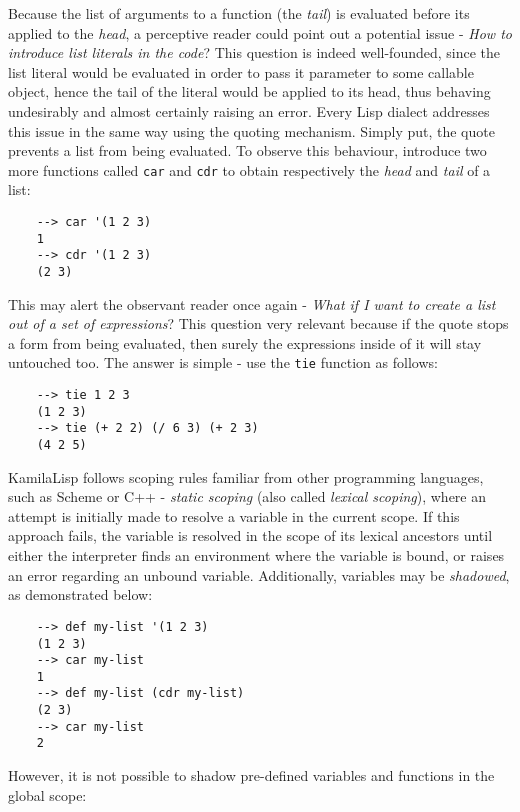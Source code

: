 Because the list of arguments to a function (the \textit{tail}) is evaluated before its applied to the \textit{head}, a perceptive reader could point out a potential issue - \textit{How to introduce list literals in the code}? This question is indeed well-founded, since the list literal would be evaluated in order to pass it parameter to some callable object, hence the tail of the literal would be applied to its head, thus behaving undesirably and almost certainly raising an error. Every Lisp dialect addresses this issue in the same way using the quoting mechanism. Simply put, the quote prevents a list from being evaluated. To observe this behaviour, introduce two more functions called \verb|car| and \verb|cdr| to obtain respectively the \textit{head} and \textit{tail} of a list:

\begin{Verbatim}
    --> car '(1 2 3)
    1
    --> cdr '(1 2 3)
    (2 3)
\end{Verbatim}

This may alert the observant reader once again - \textit{What if I want to create a list out of a set of expressions}? This question very relevant because if the quote stops a form from being evaluated, then surely the expressions inside of it will stay untouched too. The answer is simple - use the \verb|tie| function as follows:

\begin{Verbatim}
    --> tie 1 2 3
    (1 2 3)
    --> tie (+ 2 2) (/ 6 3) (+ 2 3)
    (4 2 5)
\end{Verbatim}

KamilaLisp follows scoping rules familiar from other programming languages, such as Scheme or C++ - \textit{static scoping} (also called \textit{lexical scoping}), where an attempt is initially made to resolve a variable in the current scope. If this approach fails, the variable is resolved in the scope of its lexical ancestors until either the interpreter finds an environment where the variable is bound, or raises an error regarding an unbound variable. Additionally, variables may be \textit{shadowed}, as demonstrated below:

\begin{Verbatim}
    --> def my-list '(1 2 3)
    (1 2 3)
    --> car my-list
    1
    --> def my-list (cdr my-list)
    (2 3)
    --> car my-list
    2
\end{Verbatim}

However, it is not possible to shadow pre-defined variables and functions in the global scope:

